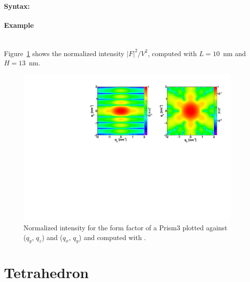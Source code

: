 \paragraph{Syntax:} 

\paragraph{Example}\mbox{}\\
Figure~\ref{fig:FFprism3Ex} shows the normalized intensity
$|F|^2/V^2$, computed with $L=10$~nm and \mbox{$H=13$~nm.}
\begin{figure}[h]
\begin{center}
\includegraphics[width=\textwidth]{Figures/figffprism3}
\end{center}
\caption{Normalized intensity for the form factor of a Prism3
 plotted against ($q_y$, $q_z$) and  ($q_x$, $q_y$) and
  computed with .}
\label{fig:FFprism3Ex}
\end{figure}

\newpage%
\section{Tetrahedron}   
 
